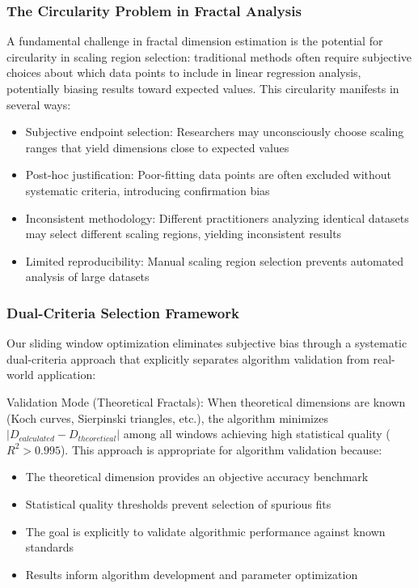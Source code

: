 \documentclass[preprint,12pt]{elsarticle}
\def\textbf#1{#1}%
\begin{document}
\subsubsection{The Circularity Problem in Fractal Analysis}

A fundamental challenge in fractal dimension estimation is the potential for circularity in scaling region selection: traditional methods often require subjective choices about which data points to include in linear regression analysis, potentially biasing results toward expected values. This circularity manifests in several ways:

\begin{itemize}
\item \textbf{Subjective endpoint selection}: Researchers may unconsciously choose scaling ranges that yield dimensions close to expected values
\item \textbf{Post-hoc justification}: Poor-fitting data points are often excluded without systematic criteria, introducing confirmation bias
\item \textbf{Inconsistent methodology}: Different practitioners analyzing identical datasets may select different scaling regions, yielding inconsistent results
\item \textbf{Limited reproducibility}: Manual scaling region selection prevents automated analysis of large datasets
\end{itemize}

\subsubsection{Dual-Criteria Selection Framework}

Our sliding window optimization eliminates subjective bias through a systematic dual-criteria approach that explicitly separates algorithm validation from real-world application:

\textbf{Validation Mode (Theoretical Fractals)}:
When theoretical dimensions are known (Koch curves, Sierpinski triangles, etc.), the algorithm minimizes $|D_{calculated} - D_{theoretical}|$ among all windows achieving high statistical quality ($R^2 > 0.995$). This approach is appropriate for algorithm validation because:
\begin{itemize}
\item The theoretical dimension provides an objective accuracy benchmark
\item Statistical quality thresholds prevent selection of spurious fits
\item The goal is explicitly to validate algorithmic performance against known standards
\item Results inform algorithm development and parameter optimization
\end{itemize}
\end{document}
